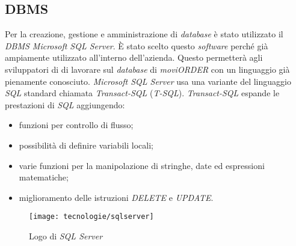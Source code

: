 \subsection{DBMS}

Per la creazione, gestione e amministrazione di \textit{database} è stato utilizzato il \textit{DBMS Microsoft SQL Server}. È stato scelto questo \textit{software} perché già ampiamente utilizzato all'interno dell'azienda. Questo permetterà agli sviluppatori di \visione{} di lavorare sul \textit{database} di \textit{moviORDER} con un linguaggio già pienamente conosciuto. \textit{Microsoft SQL Server} usa una variante del linguaggio \textit{SQL} standard chiamata \textit{Transact-SQL} (\textit{T-SQL}). \textit{Transact-SQL} espande le prestazioni di \textit{SQL} aggiungendo:
\begin{itemize}
	\item funzioni per controllo di flusso;
	\item possibilità di definire variabili locali;
	\item varie funzioni per la manipolazione di stringhe, date ed espressioni matematiche;
	\item miglioramento delle istruzioni \textit{DELETE} e \textit{UPDATE}.
\end{itemize}

\begin{figure}[!h] 
    \centering 
    \texttt{[image: tecnologie/sqlserver]} 
    \caption{Logo di \textit{SQL Server}}
\end{figure}